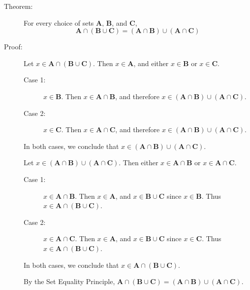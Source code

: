 \documentclass{article}
\newcommand{\A}{\mathbf A}
\newcommand{\B}{\mathbf B}
\newcommand{\C}{\mathbf C}
\begin{document}
\begin{description}
\item[Theorem:] For every choice of sets $\A$, $\B$, and $\C$,
  \begin{equation*}
  \A \cap (\B \cup \C) = (\A \cap \B) \cup (\A \cap \C)
  \end{equation*}

\item[Proof:] Let $x \in \A \cap (\B \cup \C)$. Then $x \in \A$, and either $x \in \B$ or $x \in \C$.
  \begin{description}
    \item[Case 1:] $x \in \B$. Then $x \in \A \cap \B$, and therefore $x \in (\A \cap \B) \cup (\A \cap \C)$. 
    \item[Case 2:] $x \in \C$. Then $x \in \A \cap \C$, and therefore $x \in (\A \cap \B) \cup (\A \cap \C)$.
  \end{description}

  In both cases, we conclude that $x \in (\A \cap \B) \cup (\A \cap \C)$.

  Let $x \in (\A \cap \B) \cup (\A \cap \C)$. Then either $x \in \A \cap \B$ or $x \in \A \cap \C$.
  \begin{description}
    \item[Case 1:] $x \in \A \cap \B$. Then $x \in \A$, and $x \in \B \cup \C$ since $x \in \B$. Thus $x \in \A \cap (\B \cup \C)$. 
    \item[Case 2:] $x \in \A \cap \C$. Then $x \in \A$, and $x \in \B \cup \C$ since $x \in \C$. Thus $x \in \A \cap (\B \cup \C)$.
  \end{description}

  In both cases, we conclude that $x \in \A \cap (\B \cup \C)$.

  By the Set Equality Principle, $\A \cap (\B \cup \C) = (\A \cap \B) \cup (\A \cap \C)$. 
\end{description}
\end{document}
